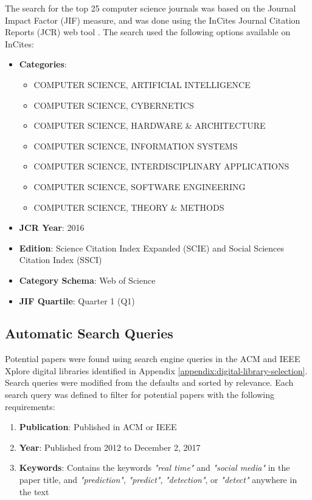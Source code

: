 \begin{appendices}
The search for the top 25 computer science journals was based on the Journal Impact Factor (JIF) \citep{Garfield:2006b} measure, and was done using the InCites Journal Citation Reports (JCR) web tool \citep{Clarivate:2017a}. The search used the following options available on InCites:

\begin{itemize}
  \item \textbf{Categories}:
	\begin{itemize}
		\item COMPUTER SCIENCE, ARTIFICIAL INTELLIGENCE
		\item COMPUTER SCIENCE, CYBERNETICS
		\item COMPUTER SCIENCE, HARDWARE \& ARCHITECTURE
		\item COMPUTER SCIENCE, INFORMATION SYSTEMS
		\item COMPUTER SCIENCE, INTERDISCIPLINARY APPLICATIONS
		\item COMPUTER SCIENCE, SOFTWARE ENGINEERING
		\item COMPUTER SCIENCE, THEORY \& METHODS
	\end{itemize}
  \item \textbf{JCR Year}: 2016
  \item \textbf{Edition}: Science Citation Index Expanded (SCIE) \citep{Garfield:2006a} and Social Sciences Citation Index (SSCI) \citep{Klein:2004}
  \item \textbf{Category Schema}: Web of Science \citep{Clarivate:2017b}
  \item \textbf{JIF Quartile}: Quarter 1 (Q1)
\end{itemize}

\subsection{Automatic Search Queries} \label{appendix:automatic-search-queries}

Potential papers were found using search engine queries in the ACM \citep{ACM:2017} and IEEE Xplore \citep{IEEE:2017} digital libraries identified in Appendix \ref{appendix:digital-library-selection}. Search queries were modified from the defaults and sorted by relevance. Each search query was defined to filter for potential papers with the following requirements:

\begin{enumerate}[label=(\alph*)]
	\item \textbf{Publication}: Published in ACM or IEEE
	\item \textbf{Year}: Published from 2012 to December 2, 2017
	\item \textbf{Keywords}: Contains the keywords \textit{"real time"} and \textit{"social media"} in the paper title, and \textit{"prediction"}, \textit{"predict"}, \textit{"detection"}, or \textit{"detect"} anywhere in the text
\end{enumerate}


\end{appendices}
